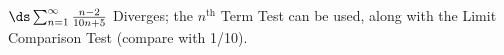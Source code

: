 {$\ds \sum_{n=1}^\infty \frac{n-2}{10n+5}$
}
{Diverges; the $n^\text{th}$ Term Test can be used, along with the Limit Comparison Test (compare with 1/10).
}